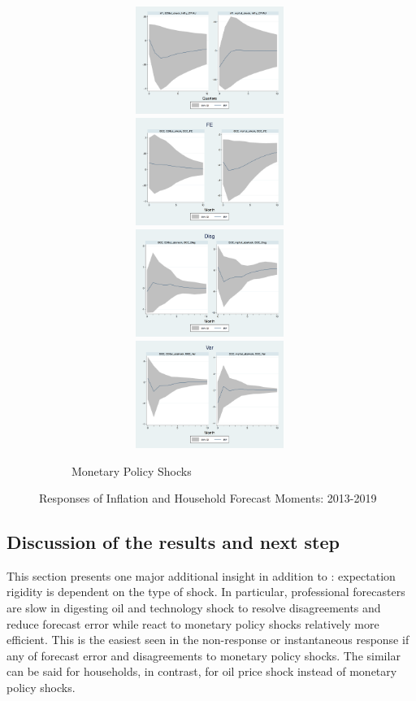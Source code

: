 \documentclass[12pt]{article}
\begin{document}
\begin{figure}[ht]
\begin{subfigure}[b]{0.65\textwidth}
			\caption{Monetary Policy Shocks}
			\includegraphics[width=9cm,height=3.5cm]{figures/CPIAU_ashocksM.png} 
			\smallskip
			\includegraphics[width=9cm,height=3.5cm]{figures/SCEFE_ashocksM.png} 
			\smallskip
			\includegraphics[width=9cm,height=3.5cm]{figures/SCEDisg_ab_ashocksM.png} 
			\smallskip 
			\includegraphics[width=9cm,height=3.5cm]{figures/SCEVar_ab_ashocksM.png} 
		\end{subfigure}
		\caption{ Responses of Inflation and Household Forecast Moments: 2013-2019}
		\label{SCE_IR}
	\end{figure}
	
	
	\subsection{Discussion of the results and next step}
	
	This section presents one major additional insight in addition to \cite{coibion2012can}: expectation rigidity is dependent on the type of shock. In particular, professional forecasters are slow in digesting oil and technology shock to resolve disagreements and reduce forecast error while react to monetary policy shocks relatively more efficient. This is the easiest seen in the non-response or instantaneous response if any of forecast error and disagreements to monetary policy shocks. The similar can be said for households, in contrast, for oil price shock instead of monetary policy shocks.
	
\end{document}
